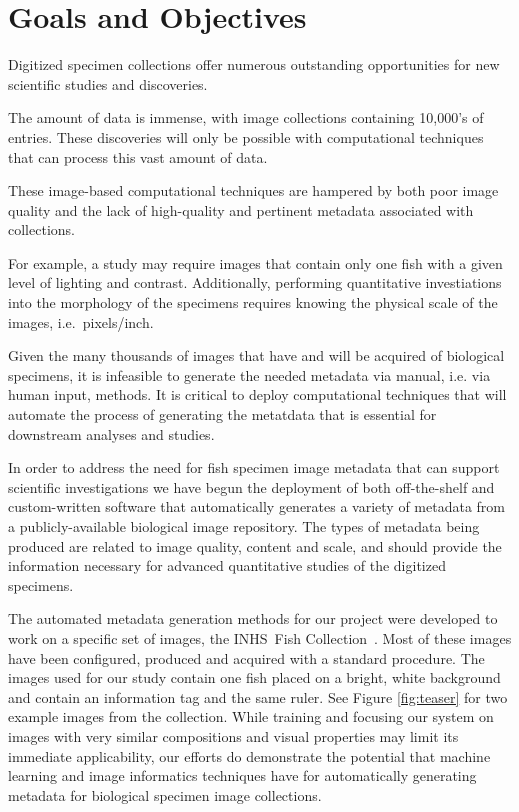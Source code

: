 \documentclass[screen,review]{acmart}
\begin{document}
\section{Goals and Objectives}

Digitized specimen collections offer numerous outstanding opportunities
for new scientific studies and discoveries.

The amount of data is immense, with image collections containing 10,000's
of entries. These discoveries will only be possible
with computational techniques that can process this vast amount of data.

These image-based computational techniques are hampered by both poor
image quality and the lack of high-quality and pertinent metadata
associated with collections.

For example, a study may require images that contain only one fish with a
given level of lighting and contrast. Additionally, performing quantitative
investiations into the morphology of the specimens requires knowing
the physical scale of the images, i.e.~pixels/inch.

Given the many thousands of images that have and will be acquired of
biological specimens, it is infeasible to generate the needed metadata
via manual, i.e. via human input, methods.  It is critical to deploy
computational techniques that will automate the process of generating
the metatdata that is essential for downstream analyses and studies.

In order to address the need for fish specimen image metadata that can
support scientific investigations we have begun the deployment of
both off-the-shelf and custom-written software that automatically
generates a variety of metadata from a publicly-available biological
image repository.  The types of metadata being produced are related
to image quality, content and scale, and should provide the information
necessary for advanced quantitative studies of the digitized specimens.

The automated metadata generation methods for our project were developed
to work on a specific set of images, the INHS\ Fish
Collection~\cite{INHS}.  Most of these images have been configured,
produced and acquired with a standard procedure.  The images used for
our study contain one fish placed on a bright, white background and
contain an information tag and the same ruler.  See 
Figure \ref{fig:teaser} for two example images from the collection.
While training and focusing our system on images with very similar
compositions and visual properties may limit its immediate applicability,
our efforts do demonstrate the potential that machine learning and
image informatics techniques have for automatically generating metadata
for biological specimen image collections.
\end{document}
